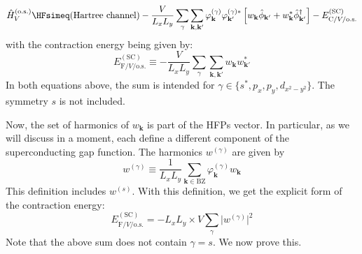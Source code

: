 \begin{equation} \label{eq:sc-V-os-cooper-int1}
	\hat H_V^{(\mathrm{o.s.})} \HFsimeq \text{(Hartree channel)}
	- \frac{V}{L_x L_y} \sum_\gamma \sum_{\mathbf{k}, \mathbf{k}'} \varphi_\mathbf{k}^{(\gamma)} \varphi_{\mathbf{k}'}^{(\gamma)*}
	\left[
		w_\mathbf{k} \hat \phi_{\mathbf{k}'} + w_\mathbf{k}^* \hat \phi_{\mathbf{k}'}^\dagger
	\right]	- E_{\mathrm{C}/V/\mathrm{o.s.}}^{(\mathrm{SC})}
\end{equation}
with the contraction energy being given by:
\[
	E_{\mathrm{F}/V/\mathrm{o.s.}}^{(\mathrm{SC})} \equiv - \frac{V}{L_x L_y} \sum_\gamma \sum_{\mathbf{k}, \mathbf{k}'}  w_\mathbf{k} w_{\mathbf{k}'}^*
\]
In both equations above, the sum is intended for $\gamma \in \lbrace s^*, p_x, p_y, d_{x^2-y^2} \rbrace$. The symmetry $s$ is not included.

Now, the set of harmonics of $w_\mathbf{k}$ is part of the HFPs vector. In particular, as we will discuss in a moment, each define a different component of the superconducting gap function. The harmonics $w^{(\gamma)}$ are given by
\begin{equation}\label{eq:sc-ehm-wgamma-harmonics}
	w^{(\gamma)} \equiv \frac{1}{L_x L_y} \sum_{\mathbf{k} \in \mathrm{BZ}} \varphi_\mathbf{k}^{(\gamma)} w_\mathbf{k}
\end{equation}
This definition includes $w^{(s)}$. With this definition, we get the explicit form of the contraction energy:
\begin{equation}\label{eq:sc-cooper-V-contraction-energy}
	E_{\mathrm{F}/V/\mathrm{o.s.}}^{(\mathrm{SC})} = - L_x L_y \times V \sum_\gamma \big| w^{(\gamma)} \big|^2
\end{equation}
Note that the above sum does not contain $\gamma=s$. We now prove this.

